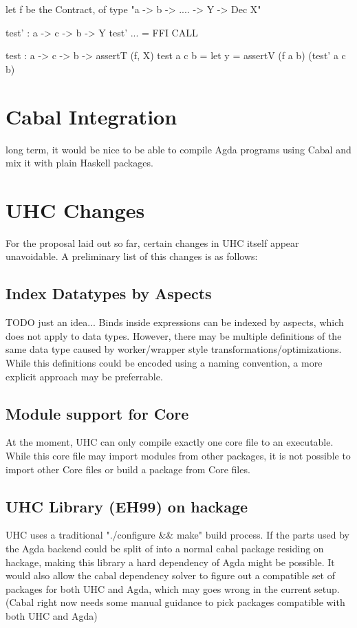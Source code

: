 \documentclass[12pt, a4paper, twoside]{report}
\begin{document}
let f be the Contract, of type "a -> b -> .... -> Y -> Dec X"

test' : a -> c -> b -> Y
test' ... = FFI CALL

test : a -> c -> b -> assertT (f, X)
test a c b = let y = assertV (f a b) (test' a c b)


\section{Cabal Integration}
long term, it would be nice to be able to compile Agda programs using Cabal and
mix it with plain Haskell packages.

\section{UHC Changes}
For the proposal laid out so far, certain changes in UHC itself appear
unavoidable. A preliminary list of this changes is as follows:

\subsection{Index Datatypes by Aspects}
TODO just an idea...
Binds inside expressions can be indexed by aspects, which does
not apply to data types. However, there may be multiple definitions
of the same data type caused by worker/wrapper style transformations/optimizations.
While this definitions could be encoded using a naming convention, a more explicit
approach may be preferrable.

\subsection{Module support for Core}
At the moment, UHC can only compile exactly one core file to an executable.
While this core file may import modules from other packages, it is not possible
to import other Core files or build a package from Core files.

\subsection{UHC Library (EH99) on hackage}
UHC uses a traditional "./configure \&\& make" build process. If the parts used by the
Agda backend could be split of into a normal cabal package residing on hackage,
making this library a hard dependency of Agda might be possible.
It would also allow the cabal dependency solver to figure out a compatible
set of packages for both UHC and Agda, which may goes wrong in the current setup.
(Cabal right now needs some manual guidance to pick packages compatible with both UHC and Agda)
\end{document}
